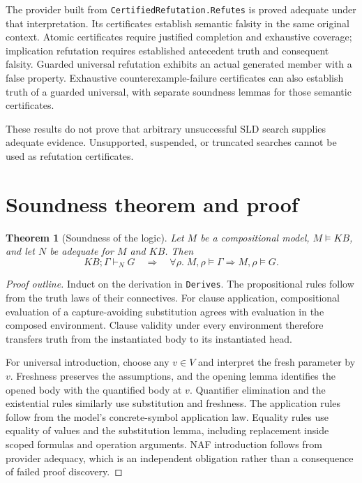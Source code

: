 \documentclass[11pt]{article}
\newtheorem{theorem}{Theorem}
\newcommand{\KB}{\mathit{KB}}
\begin{document}
The provider built from \texttt{CertifiedRefutation.Refutes} is proved adequate
under that interpretation. Its certificates establish semantic falsity in the
same original context. Atomic certificates require justified completion and
exhaustive coverage; implication refutation requires established antecedent
truth and consequent falsity. Guarded universal refutation exhibits an actual
generated member with a false property. Exhaustive counterexample-failure
certificates can also establish truth of a guarded universal, with separate
soundness lemmas for those semantic certificates.

These results do not prove that arbitrary unsuccessful SLD search supplies
adequate evidence. Unsupported, suspended, or truncated searches cannot be
used as refutation certificates.

\section{Soundness theorem and proof}
\begin{theorem}[Soundness of the logic]\label{thm:soundness}
Let $M$ be a compositional model, $M\models\KB$, and let $N$ be adequate for
$M$ and $\KB$. Then
\[
 \KB;\Gamma\vdash_N G
 \quad\Longrightarrow\quad
 \forall\rho.\;M,\rho\models\Gamma\Rightarrow M,\rho\models G.
\]
\end{theorem}

\begin{proof}[Proof outline]
Induct on the derivation in \texttt{Derives}.
The propositional rules follow from the truth laws of their connectives.
For clause application, compositional evaluation of a capture-avoiding
substitution agrees with evaluation in the composed environment. Clause validity
under every environment therefore transfers truth from the instantiated body
to its instantiated head.

For universal introduction, choose any $v\in V$ and interpret the fresh
parameter by $v$. Freshness preserves the assumptions, and the opening lemma
identifies the opened body with the quantified body at $v$. Quantifier
elimination and the existential rules similarly use substitution and freshness.
The application rules follow from the model's concrete-symbol application law.
Equality rules use equality of values and the substitution lemma, including
replacement inside scoped formulas and operation arguments.
NAF introduction follows from provider adequacy, which is an independent
obligation rather than a consequence of failed proof discovery.
\end{proof}
\end{document}
